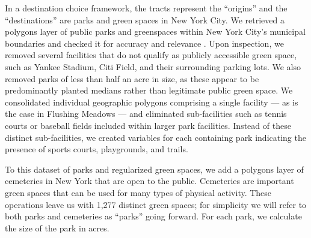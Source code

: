 \documentclass[shortAfour,sageh.bst]{sagej}
\begin{document}
In a destination choice framework, the tracts represent the ``origins''
and the ``destinations'' are parks and green spaces in New York City. We
retrieved a polygons layer of public parks and greenspaces within New
York City's municipal boundaries and checked it for accuracy and
relevance \citep{nycparks}. Upon inspection, we removed several
facilities that do not qualify as publicly accessible green space, such
as Yankee Stadium, Citi Field, and their surrounding parking lots. We
also removed parks of less than half an acre in size, as these appear to
be predominantly planted medians rather than legitimate public green
space. We consolidated individual geographic polygons comprising a
single facility --- as is the case in Flushing Meadows --- and
eliminated sub-facilities such as tennis courts or baseball fields
included within larger park facilities. Instead of these distinct
sub-facilities, we created variables for each containing park indicating
the presence of sports courts, playgrounds, and trails.

To this dataset of parks and regularized green spaces, we add a polygons
layer of cemeteries in New York that are open to the public. Cemeteries
are important green spaces that can be used for many types of physical
activity. These operations leave us with 1,277 distinct green spaces;
for simplicity we will refer to both parks and cemeteries as ``parks''
going forward. For each park, we calculate the size of the park in
acres.
\end{document}
